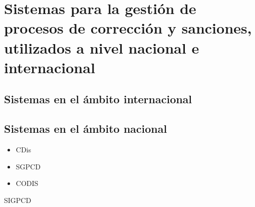 \section[Sistemas homólogos]{Sistemas para la gestión de procesos de corrección y sanciones, utilizados a nivel nacional e internacional}

\subsection{Sistemas en el ámbito internacional}

\subsection{Sistemas en el ámbito nacional}
\begin{itemize}
	\item CDis
	\item SGPCD
	\item CODIS
\end{itemize}


SIGPCD \cite{Awad2005}
	
